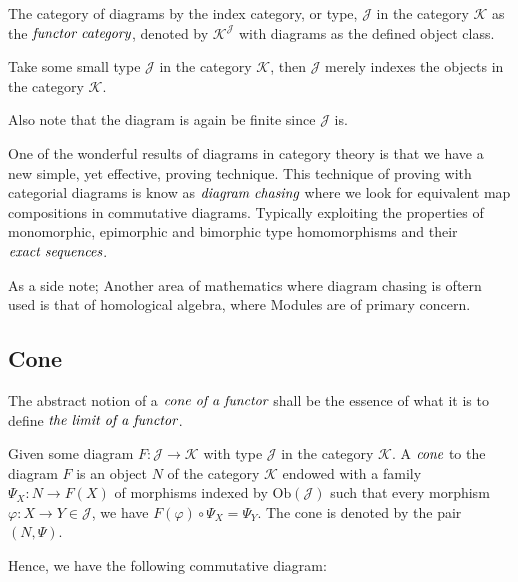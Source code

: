 \documentclass[10pt, oneside, reqno]{amsart}
\begin{document}
\begin{defn}
 The category of diagrams by the index category, or type, $\mathcal{J}$ in the category $\mathcal{K}$ as the $\emph{functor category}$,
 denoted by $\mathcal{K}^{\mathcal{J}}$ with diagrams as the defined object class.
\end{defn}

\begin{exmp}
 Take some small type $\mathcal{J}$ in the category $\mathcal{K}$,
 then $\mathcal{J}$ merely indexes the objects in the category $\mathcal{K}$.
 \begin{rem}
  Also note that the diagram is again be finite since $\mathcal{J}$ is.
 \end{rem}
\end{exmp}

One of the wonderful results of diagrams in category theory is that we have a new simple, yet effective, proving technique.
This technique of proving with categorial diagrams is know as $\emph{diagram chasing}$ where we look for equivalent map compositions in commutative diagrams.
Typically exploiting the properties of monomorphic, epimorphic and bimorphic type homomorphisms and their $\emph{exact sequences}$.
\begin{note}
 As a side note;
 Another area of mathematics where diagram chasing is oftern used is that of homological algebra, where Modules are of primary concern.
\end{note}

\subsection{Cone} %
\label{subsec:cone}
The abstract notion of a $\emph{cone of a functor}$ shall be the essence of what it is to define $\emph{the limit of a functor}$.

\begin{defn}
 Given some diagram $F: \mathcal{J} \to \mathcal{K}$ with type $\mathcal{J}$ in the category $\mathcal{K}$.
 A $\emph{cone}$ to the diagram $F$ is an object $N$ of the category $\mathcal{K}$ endowed with a family $\Psi_{X}: N \to F(X)$ of morphisms
 indexed by $\text{Ob}(\mathcal{J})$ such that every morphism $\varphi: X \to Y \in \mathcal{J}$, we have $F(\varphi) \circ \Psi_{X} = \Psi_{Y}$.
 The cone is denoted by the pair $(N, \Psi)$.
\end{defn}

Hence, we have the following commutative diagram:
\end{document}
